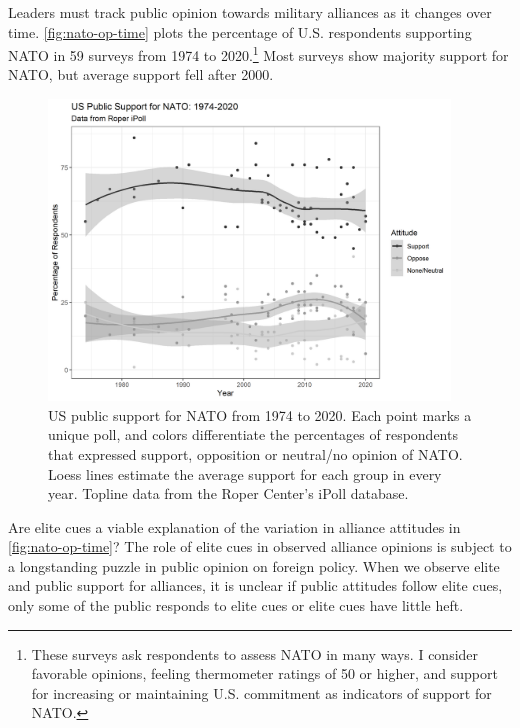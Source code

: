 \documentclass[12pt]{article}
\begin{document}
Leaders must track public opinion towards military alliances as it changes over time. 
\autoref{fig:nato-op-time} plots the percentage of U.S. respondents supporting NATO in 59 surveys from 1974 to 2020.\footnote{These surveys ask respondents to assess NATO in many ways. I consider favorable opinions, feeling thermometer ratings of 50 or higher, and support for increasing or maintaining U.S. commitment as indicators of support for NATO.} 
Most surveys show majority support for NATO, but average support fell after 2000.  


\begin{figure}
	\centering
		\includegraphics[width=0.95\textwidth]{../figures/nato-op-time.png}
	\caption{US public support for NATO from 1974 to 2020. Each point marks a unique poll, and colors differentiate the percentages of respondents that expressed support, opposition or neutral/no opinion of NATO. Loess lines estimate the average support for each group in every year. Topline data from the Roper Center's iPoll database.}
	\label{fig:nato-op-time}
\end{figure}


Are elite cues a viable explanation of the variation in alliance attitudes in \autoref{fig:nato-op-time}? 
The role of elite cues in observed alliance opinions is subject to a longstanding puzzle in public opinion on foreign policy.
When we observe elite and public support for alliances, it is unclear if public attitudes follow elite cues, only some of the public responds to elite cues or elite cues have little heft. 
\end{document}
